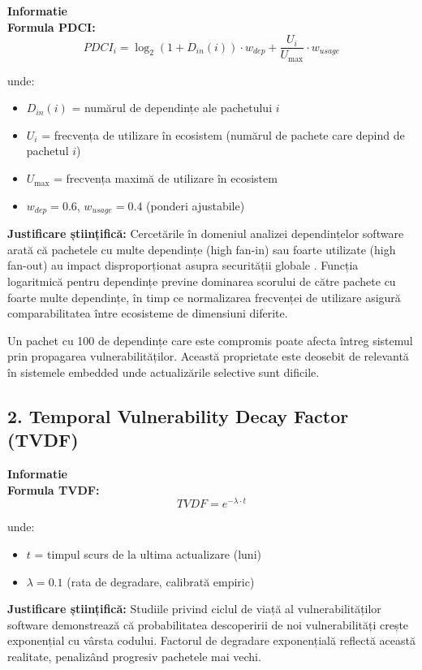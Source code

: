\documentclass[12pt,a4paper]{article}
\newenvironment{infobox}{%
\begin{leftbar}
\color{black}
\textbf{Informatie}\\[0.5em]
}{%
\end{leftbar}
}
\begin{document}
\begin{infobox}
\textbf{Formula PDCI:}
\[PDCI_i = \log_2(1 + D_{in}(i)) \cdot w_{dep} + \frac{U_i}{U_{\max}} \cdot w_{usage}\]

unde:
\begin{itemize}
\item $D_{in}(i)$ = numărul de dependințe ale pachetului $i$
\item $U_i$ = frecvența de utilizare în ecosistem (numărul de pachete care depind de pachetul $i$)
\item $U_{\max}$ = frecvența maximă de utilizare în ecosistem
\item $w_{dep} = 0.6$, $w_{usage} = 0.4$ (ponderi ajustabile)
\end{itemize}
\end{infobox}

\textbf{Justificare științifică:} Cercetările în domeniul analizei dependințelor software arată că pachetele cu multe dependințe (high fan-in) sau foarte utilizate (high fan-out) au impact disproporționat asupra securității globale \cite{cox2019surviving,decan2018impact}. Funcția logaritmică pentru dependințe previne dominarea scorului de către pachete cu foarte multe dependințe, în timp ce normalizarea frecvenței de utilizare asigură comparabilitatea între ecosisteme de dimensiuni diferite.

Un pachet cu 100 de dependințe care este compromis poate afecta întreg sistemul prin propagarea vulnerabilităților. Această proprietate este deosebit de relevantă în sistemele embedded unde actualizările selective sunt dificile.

\subsection{2. Temporal Vulnerability Decay Factor (TVDF)}

\begin{infobox}
\textbf{Formula TVDF:}
\[TVDF = e^{-\lambda \cdot t}\]

unde:
\begin{itemize}
\item $t$ = timpul scurs de la ultima actualizare (luni)
\item $\lambda = 0.1$ (rata de degradare, calibrată empiric)
\end{itemize}
\end{infobox}

\textbf{Justificare științifică:} Studiile privind ciclul de viață al vulnerabilităților software demonstrează că probabilitatea descoperirii de noi vulnerabilități crește exponențial cu vârsta codului. Factorul de degradare exponențială reflectă această realitate, penalizând progresiv pachetele mai vechi.
\end{document}
